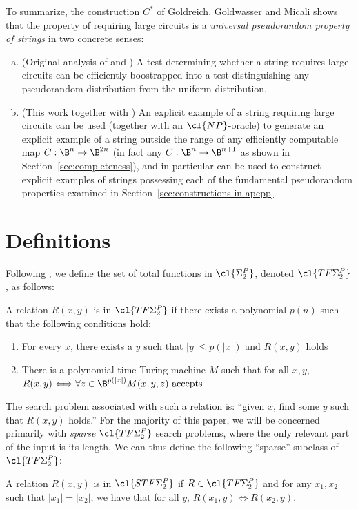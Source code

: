 To summarize, the construction $C^*$ of Goldreich, Goldwasser and Micali shows that the property of requiring large circuits is a \emph{universal pseudorandom property of strings} in two concrete senses:
\begin{enumerate}[(a)]
    \item (Original analysis of \cite{GGM} and \cite{natural-proofs}) A test determining whether a string requires large circuits can be efficiently boostrapped into a test distinguishing any pseudorandom distribution from the uniform distribution.
    \item (This work together with \cite{Jerabek}) An explicit example of a string requiring large circuits can be used (together with an $\cl{NP}$-oracle) to generate an explicit example of a string outside the range of any efficiently computable map $C: \B^n \rightarrow \B^{2n}$ (in fact any $C: \B^n \rightarrow \B^{n+1}$ as shown in Section~\ref{sec:completeness}), and in particular can be used to construct explicit examples of strings possessing each of the fundamental pseudorandom properties examined in Section~\ref{sec:constructions-in-apepp}.
\end{enumerate}

\section{Definitions}\label{sec:defs}

 Following \cite{total}, we define the set of total functions in $\cl{\Sigma_2^P}$, denoted $\cl{TF\Sigma_2^P}$, as follows:
\begin{definition}
A relation $R(x,y)$ is in $\cl{TF\Sigma_2^P}$ if there exists a polynomial $p(n)$ such that the following conditions hold:
\begin{enumerate}
    \item For every $x$, there exists a $y$ such that $|y| \leq p(|x|)$ and $R(x,y)$ holds
    \item There is a polynomial time Turing machine $M$ such that for all $x,y$, \\
    $R(x,y) \Longleftrightarrow \forall z \in \B^{p(|x|)} M(x,y,z) \text{ accepts}$
\end{enumerate}
\end{definition}
The search problem associated with such a relation is: ``given $x$, find some $y$ such that $R(x,y)$ holds.'' For the majority of this paper, we will be concerned primarily with \emph{sparse} $\cl{TF\Sigma_2^P}$ search problems, where the only relevant part of the input is its length. We can thus define the following ``sparse'' subclass of $\cl{TF\Sigma_2^P}$:
\begin{definition}
A relation $R(x,y)$ is in $\cl{STF\Sigma_2^P}$ if $R \in \cl{TF\Sigma_2^P}$ and for any $x_1,x_2$ such that $|x_1|=|x_2|$, we have that for all $y$, $R(x_1,y) \Leftrightarrow R(x_2,y)$.
\end{definition}

